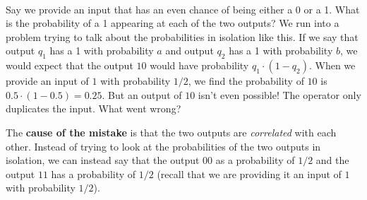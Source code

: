 \documentclass[runningheads]{llncs}
\begin{document}
\begin{minipage}{.5\textwidth}
    \centering
{}
\end{minipage}
\\

Say we provide an input that has an even chance of being either a 0 or a 1. What is the probability of a 1 appearing at each of the two outputs?
We run into a problem trying to talk about the probabilities in isolation like this. If we say that output $q_1$ has a 1 with probability
$a$ and output $q_2$ has a 1 with probability $b$, we would expect that the output $10$ would have probability $q_1 \cdot (1 - q_2)$. When
we provide an input of $1$ with probability $1/2$, we find the probability of $10$ is $0.5 \cdot (1 - 0.5) = 0.25$. But an
output of $10$ isn't even possible! The operator only duplicates the input. What went wrong?

The \textbf{cause of the mistake} is that the two outputs are \textit{correlated} with each other. Instead of trying to look at the probabilities of the two outputs in isolation, we can
instead say that the output $00$ as a probability of $1/2$ and the output $11$ has a probability of $1/2$ (recall that we are providing it an input of $1$ with probability $1/2$).
\end{document}
